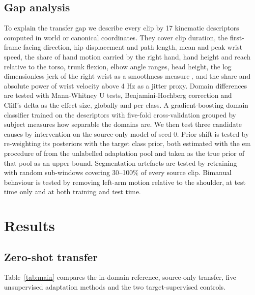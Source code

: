 \documentclass[]{interact}
\begin{document}
\subsection{Gap analysis}

To explain the transfer gap we describe every clip by 17 kinematic descriptors
computed in world or canonical coordinates. They cover clip duration, the
first-frame facing direction, hip displacement and path length, mean and peak
wrist speed, the share of hand motion carried by the right hand, hand height
and reach relative to the torso, trunk flexion, elbow angle ranges, head
height, the log dimensionless jerk of the right wrist as a smoothness
measure \citep{balasubramanian2015smoothness}, and the share and absolute power
of wrist velocity above 4 Hz as a jitter proxy. Domain differences are tested
with Mann-Whitney U tests, Benjamini-Hochberg correction and Cliff's delta as
the effect size, globally and per class. A gradient-boosting domain classifier
trained on the descriptors with five-fold cross-validation grouped by subject
measures how separable the domains are. We then test three candidate causes by
intervention on the source-only model of seed 0. Prior shift is tested by
re-weighting its posteriors with the target class prior, both estimated with
the \ac{em} procedure of \citet{saerens2002priors} from the
unlabelled adaptation pool and taken as the true prior of that pool as an upper
bound. Segmentation artefacts are tested by retraining with random sub-windows
covering 30--100\% of every source clip. Bimanual behaviour is tested by
removing left-arm motion relative to the shoulder, at test time only and at
both training and test time.

\section{Results}
\label{sec:results}

\subsection{Zero-shot transfer}

Table~\ref{tab:main} compares the in-domain reference, source-only transfer,
five unsupervised adaptation methods and the two target-supervised controls.
\end{document}
